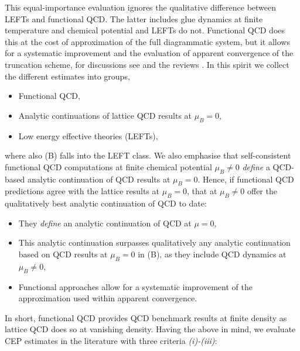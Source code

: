 \documentclass[reprint,twocolumn,superscriptaddress,preprintnumbers,amsmath,amssymb,aps,prd,floatfix]{revtex4-2}
\begin{document}
This equal-importance evaluation ignores the qualitative difference between LEFTs and functional QCD. The latter includes glue dynamics at finite temperature and chemical potential and LEFTs do not. Functional QCD does this at the cost of approximation of the full diagrammatic system, but it allows for a systematic improvement and the evaluation of apparent convergence of the truncation scheme, for discussions see \cite{Fu:2019hdw} and the reviews \cite{Fischer:2018sdj, Dupuis:2020fhh, Fu:2022gou}. In this spirit we collect the different estimates into groups,
%
\begin{itemize}
    \item[(A)] Functional QCD,
    \item[(B)] Analytic continuations of lattice QCD results at $\mu_B=0$,
    \item[(C)] Low energy effective theories (LEFTs),
\end{itemize}
%
where also (B) falls into the LEFT class. We also emphasise that self-consistent functional QCD computations at finite chemical potential $\mu_B\neq 0$ \textit{define} a QCD-based analytic continuation of QCD results at $\mu_B=0$. Hence, if functional QCD predictions agree with the lattice results at $\mu_B=0$, that at $\mu_B\neq 0$ offer the qualitatively best analytic continuation of QCD to date:  
%
\begin{itemize}
    \item[(1)] They \textit{define} an analytic continuation of QCD at $\mu=0$,
    \item[(2)] This analytic continuation surpasses qualitatively any analytic continuation based on QCD results at $\mu_B=0$ in (B), as they include QCD dynamics at $\mu_B\neq 0$,
    \item[(3)] Functional approaches allow for a systematic improvement of the approximation used within apparent convergence. 
\end{itemize}
%
In short, functional QCD provides QCD benchmark results at finite density as lattice QCD does so at vanishing density. Having the above in mind, we evaluate CEP estimates in the literature with three criteria \textit{(i)-(iii)}: 
%
\end{document}
